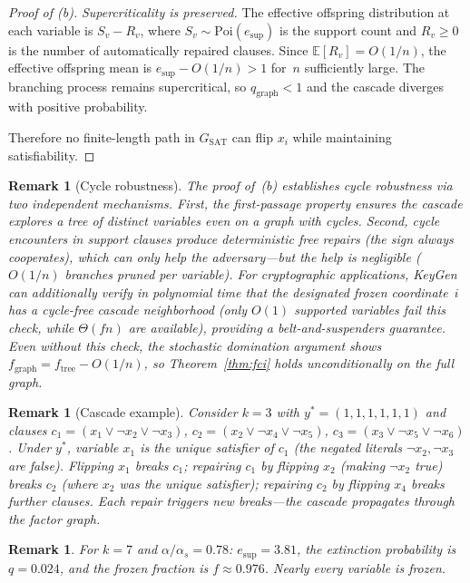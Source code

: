 \documentclass[11pt]{article}
\newtheorem{remark}[theorem]{Remark}
\begin{document}
\begin{proof}[Proof of (b)]
\emph{Supercriticality is preserved.}  The effective offspring distribution at each variable is $S_v - R_v$, where $S_v \sim \mathrm{Poi}(e_{\mathrm{sup}})$ is the support count and $R_v \geq 0$ is the number of automatically repaired clauses.  Since $\mathbb{E}[R_v] = O(1/n)$, the effective offspring mean is $e_{\mathrm{sup}} - O(1/n) > 1$ for~$n$ sufficiently large.  The branching process remains supercritical, so $q_{\mathrm{graph}} < 1$ and the cascade diverges with positive probability.

Therefore no finite-length path in $G_{\mathrm{SAT}}$ can flip $x_i$ while maintaining satisfiability.
\end{proof}

\begin{remark}[Cycle robustness]\label{rem:cycle-robust}
The proof of~(b) establishes cycle robustness via two independent mechanisms.  First, the first-passage property ensures the cascade explores a tree of distinct variables even on a graph with cycles.  Second, cycle encounters in support clauses produce \emph{deterministic} free repairs (the sign always cooperates), which can only help the adversary---but the help is negligible ($O(1/n)$ branches pruned per variable).  For cryptographic applications, KeyGen can additionally verify in polynomial time that the designated frozen coordinate~$i$ has a cycle-free cascade neighborhood (only $O(1)$ supported variables fail this check, while $\Theta(fn)$ are available), providing a belt-and-suspenders guarantee.  Even without this check, the stochastic domination argument shows $f_{\mathrm{graph}} = f_{\mathrm{tree}} - O(1/n)$, so Theorem~\ref{thm:fci} holds unconditionally on the full graph.
\end{remark}

\begin{remark}[Cascade example]
Consider $k = 3$ with $y^* = (1,1,1,1,1,1)$ and clauses $c_1 = (x_1 \vee \neg x_2 \vee \neg x_3)$, $c_2 = (x_2 \vee \neg x_4 \vee \neg x_5)$, $c_3 = (x_3 \vee \neg x_5 \vee \neg x_6)$.  Under $y^*$, variable $x_1$ is the unique satisfier of $c_1$ (the negated literals $\neg x_2, \neg x_3$ are false).  Flipping $x_1$ breaks $c_1$; repairing $c_1$ by flipping $x_2$ (making $\neg x_2$ true) breaks $c_2$ (where $x_2$ was the unique satisfier); repairing $c_2$ by flipping $x_4$ breaks further clauses.  Each repair triggers new breaks---the cascade propagates through the factor graph.
\end{remark}

\begin{remark}\label{rem:params}
For $k = 7$ and $\alpha/\alpha_s = 0.78$: $e_{\mathrm{sup}} = 3.81$, the extinction probability is $q = 0.024$, and the frozen fraction is $f \approx 0.976$.  Nearly every variable is frozen.
\end{remark}
\end{document}
